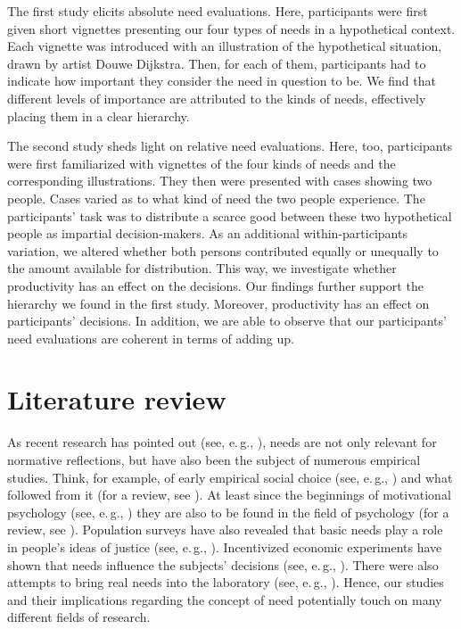 \documentclass[10pt,letterpaper]{article}
\begin{document}
The first study elicits absolute need evaluations.
Here, participants were first given short vignettes presenting our four types of needs in a hypothetical context.
Each vignette was introduced with an illustration of the hypothetical situation, drawn by artist Douwe Dijkstra.
Then, for each of them, participants had to indicate how important they consider the need in question to be.
We find that different levels of importance are attributed to the kinds of needs, effectively placing them in a clear hierarchy.

The second study sheds light on relative need evaluations.
Here, too, participants were first familiarized with vignettes of the four kinds of needs and the corresponding illustrations.
They then were presented with cases showing two people.
Cases varied as to what kind of need the two people experience.
The participants' task was to distribute a scarce good between these two hypothetical people as impartial decision-makers.
As an additional within-participants variation, we altered whether both persons contributed equally or unequally to the amount available for distribution.
This way, we investigate whether productivity has an effect on the decisions.
Our findings further support the hierarchy we found in the first study.
Moreover, productivity has an effect on participants' decisions.
In addition, we are able to observe that our participants’ need evaluations are coherent in terms of adding up.


\section*{Literature review}\label{sec:literature}
As recent research has pointed out (see, e.\,g., \cite{kittel_impact_2020,bauer_need_2022}), needs are not only relevant for normative reflections, but have also been the subject of numerous empirical studies.
Think, for example, of early empirical social choice (see, e.\,g., \cite{yaari_dividing_1984}) and what followed from it (for a review, see \cite{gaertner_empirical_2012}).
At least since the beginnings of motivational psychology (see, e.\,g., \cite{williams_multi-dimensional_1989}) they are also to be found in the field of psychology (for a review, see \cite{diederich_identifying_2020}).
Population surveys have also revealed that basic needs play a role in people's ideas of justice (see, e.\,g., \cite{reeskens_equity_2013,hulle_measuring_2018}).
Incentivized economic experiments have shown that needs influence the subjects' decisions (see, e.\,g., \cite{branas_poverty_2006,cappelen_needs_2013}).
There were also attempts to bring real needs into the laboratory (see, e.\,g., \cite{kause_selfish_2018}).
Hence, our studies and their implications regarding the concept of need potentially touch on many different fields of research.
\end{document}
